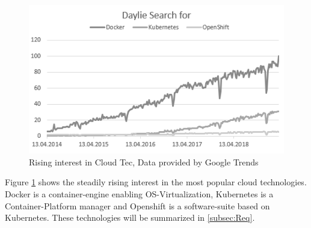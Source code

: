 \documentclass[utf8]{lni}
\begin{document}
\begin{figure}[h]
	\centering
	\includegraphics[width=0.5\linewidth]{imgs/DigDocker}
	\caption{Rising interest in Cloud Tec, Data provided by Google Trends}
	\label{fig:digdocker}	
\end{figure}

Figure \ref{fig:digdocker} shows the steadily rising interest in the most popular cloud technologies. 
Docker is a container-engine enabling OS-Virtualization, Kubernetes is a Container-Platform manager and Openshift is a software-suite based on Kubernetes. 
These technologies will be summarized in \ref{subsec:Req}.  
\end{document}
